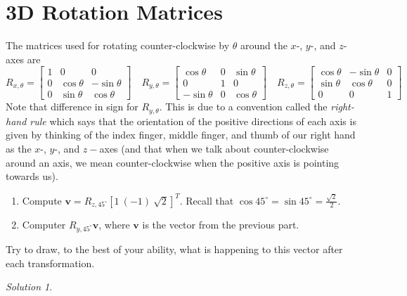 \documentclass{article}
\newcommand{\vv}[1]{\mathbf{#1}}
\theoremstyle{remark}
\newtheorem*{solution}{Solution}
\begin{document}
\pagebreak
\section{3D Rotation Matrices}

The matrices used for rotating counter-clockwise by $\theta$ around the $x$-, $y$-, and $z$-axes are
\begin{displaymath}
  R_{x, \theta} =
  \begin{bmatrix}
    1 & 0 & 0 \\
    0 & \cos\theta & -\sin\theta \\
    0 & \sin\theta & \cos\theta
  \end{bmatrix}
  \quad
  R_{y, \theta} =
  \begin{bmatrix}
    \cos\theta & 0 & \sin\theta \\
    0 & 1 & 0 \\
    -\sin\theta & 0 & \cos\theta
  \end{bmatrix}
  \quad
  R_{z, \theta} =
  \begin{bmatrix}
    \cos\theta & -\sin \theta & 0 \\
    \sin\theta & \cos\theta & 0 \\
    0 & 0 & 1
  \end{bmatrix}
\end{displaymath}
Note that difference in sign for $R_{y, \theta}$.
This is due to a convention called the \textit{right-hand rule} which says that the orientation of the positive directions of each axis is given by thinking of the index finger, middle finger, and thumb of our right hand as the $x$-, $y$-, and $z-$axes (and that when we talk about counter-clockwise around an axis, we mean counter-clockwise when the positive axis is pointing towards us).

\medskip

\begin{enumerate}
\item Compute $\vv v = R_{z, 45^\circ} [1 \ (-1) \ \sqrt{2}]^T$. Recall that $\cos45^\circ = \sin45^\circ = \frac{\sqrt{2}}{2}$.
\item Computer $R_{y, 45^\circ}\vv v$, where $\vv v$ is the vector from the previous part.
\end{enumerate}
Try to draw, to the best of your ability, what is happening to this vector after each transformation.
\medskip

\begin{solution}
\end{solution}
\end{document}
